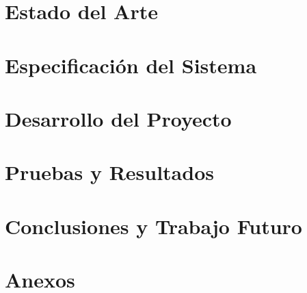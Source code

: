 \documentclass[twoside,spanish,a4paper,12pt]{tfg}
\begin{document}
\chapter{Estado del Arte}


\chapter{Especificación del Sistema}


\chapter{Desarrollo del Proyecto}


\chapter{Pruebas y Resultados}


\chapter{Conclusiones y Trabajo Futuro}


\pagestyle{appendix}

\appendix
\chapter{Anexos}




\end{document}
